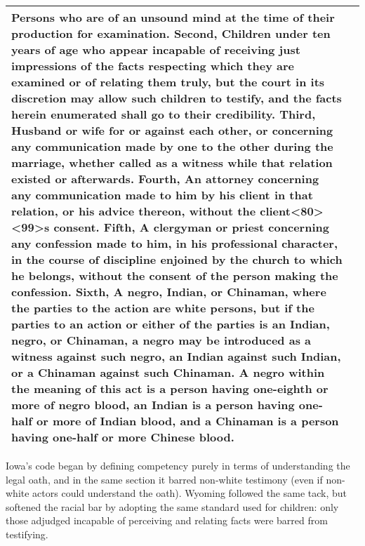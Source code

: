 \documentclass[12pt,]{article}
\begin{document}
\begin{longtable}[]{@{}ll@{}}
\begin{minipage}[t]{0.74\columnwidth}
Persons who are of an unsound mind at the time of their production for
examination. Second, Children under ten years of age who appear
incapable of receiving just impressions of the facts respecting which
they are examined or of relating them truly, but the court in its
discretion may allow such children to testify, and the facts herein
enumerated shall go to their credibility. Third, Husband or wife for or
against each other, or concerning any communication made by one to the
other during the marriage, whether called as a witness while that
relation existed or afterwards. Fourth, An attorney concerning any
communication made to him by his client in that relation, or his advice
thereon, without the
client\textless80\textgreater\textless99\textgreater s consent. Fifth, A
clergyman or priest concerning any confession made to him, in his
professional character, in the course of discipline enjoined by the
church to which he belongs, without the consent of the person making the
confession. Sixth, A negro, Indian, or Chinaman, where the parties to
the action are white persons, but if the parties to an action or either
of the parties is an Indian, negro, or Chinaman, a negro may be
introduced as a witness against such negro, an Indian against such
Indian, or a Chinaman against such Chinaman. A negro within the meaning
of this act is a person having one-eighth or more of negro blood, an
Indian is a person having one-half or more of Indian blood, and a
Chinaman is a person having one-half or more Chinese blood.\strut
\end{minipage}\tabularnewline
\bottomrule
\end{longtable}

Iowa's code began by defining competency purely in terms of
understanding the legal oath, and in the same section it barred
non-white testimony (even if non-white actors could understand the
oath). Wyoming followed the same tack, but softened the racial bar by
adopting the same standard used for children: only those adjudged
incapable of perceiving and relating facts were barred from testifying.
\end{document}
